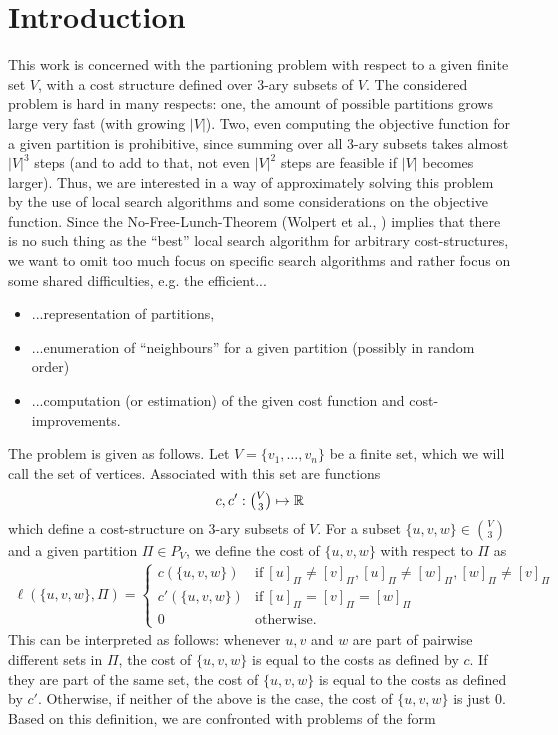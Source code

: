 \section{Introduction}
This work is concerned with the partioning problem with respect to a given finite set $V$, with a cost structure defined over 3-ary subsets of $V$. The considered problem is hard in many respects: one, the amount of possible partitions grows large very fast (with growing $|V|$). Two, even computing the objective function for a given partition is prohibitive, since summing over all $3$-ary subsets takes almost $|V|^3$ steps (and to add to that, not even $|V|^2$ steps are feasible if $|V|$ becomes larger). Thus, we are interested in a way of approximately solving this problem by the use of local search algorithms and some considerations on the objective function. Since the No-Free-Lunch-Theorem (Wolpert et al., \cite{wolpert1995no}) implies that there is no such thing as the ``best'' local search algorithm for arbitrary cost-structures, we want to omit too much focus on specific search algorithms and rather focus on some shared difficulties, e.g. the efficient... 
\begin{itemize}
    \item ...representation of partitions,
    \item ...enumeration of ``neighbours'' for a given partition (possibly in random order)
    \item ...computation (or estimation) of the given cost function and cost-improvements.
\end{itemize}
The problem is given as follows. Let $V = \{ v_1,\dots,v_n \}$ be a finite set, which we will call the set of vertices. Associated with this set are functions $$ c,c': \tbinom{V}{3} \mapsto \mathbb{R} $$ which define a cost-structure on $3$-ary subsets of $V$. For a subset $\{u,v,w\} \in \binom{V}{3}$ and a given partition $\Pi \in P_V$, we define the cost of $\{u,v,w\}$ with respect to $\Pi$ as  
\begin{align*}
    \ell(\{u,v,w\},\Pi) = \begin{cases}
        c(\{u,v,w\}) & \text{if}\ [u]_\Pi \neq [v]_\Pi, [u]_\Pi \neq [w]_\Pi, [w]_\Pi \neq [v]_\Pi \\
        c'(\{u,v,w\}) & \text{if}\ [u]_\Pi = [v]_\Pi = [w]_\Pi \\
        0 & \text{otherwise.}
    \end{cases}
\end{align*}
This can be interpreted as follows: whenever $u,v$ and $w$ are part of pairwise different sets in $\Pi$, the cost of $\{u,v,w\}$ is equal to the costs as defined by $c$. If they are part of the same set, the cost of $\{u,v,w\}$ is equal to the costs as defined by $c'$. Otherwise, if neither of the above is the case, the cost of $\{u,v,w\}$ is just $0$. Based on this definition, we are confronted with problems of the form
